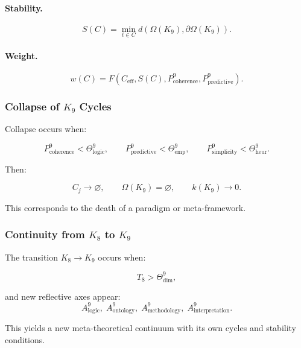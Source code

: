 \paragraph{Stability.}
\[
  S(C)
    = \min_{t\in C}
      d(\Omega(K_9),\partial\Omega(K_9)).
\]

\paragraph{Weight.}
\[
  w(C) = F(C_{\mathrm{eff}}, S(C),
          P^9_{\mathrm{coherence}},
          P^9_{\mathrm{predictive}}).
\]


\subsubsection{Collapse of \texorpdfstring{$K_9$}{K_9} Cycles}

Collapse occurs when:

\[
  P^9_{\mathrm{coherence}} < \Theta^9_{\mathrm{logic}},\qquad
  P^9_{\mathrm{predictive}} < \Theta^9_{\mathrm{emp}},\qquad
  P^9_{\mathrm{simplicity}} < \Theta^9_{\mathrm{heur}}.
\]

Then:

\[
  C_j \to \varnothing,\qquad
  \Omega(K_9)=\varnothing,\qquad
  k(K_9)\to 0.
\]

This corresponds to the death of a paradigm or meta-framework.


\subsubsection{Continuity from \texorpdfstring{$K_8$}{K_8} to \texorpdfstring{$K_9$}{K_9}}

The transition $K_8\to K_9$ occurs when:

\[
  T_8 > \Theta^9_{\mathrm{dim}},
\]

and new reflective axes appear:
\[
  A^9_{\mathrm{logic}},\;
  A^9_{\mathrm{ontology}},\;
  A^9_{\mathrm{methodology}},\;
  A^9_{\mathrm{interpretation}}.
\]

This yields a new meta-theoretical continuum with its own cycles and stability
conditions.
